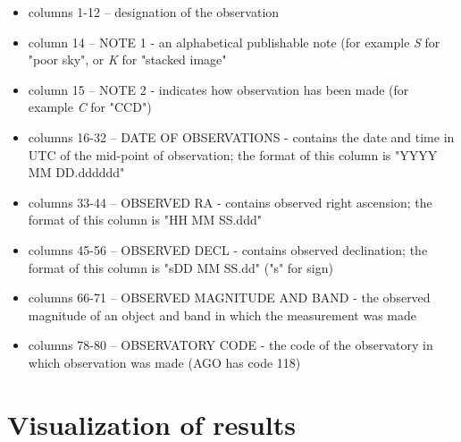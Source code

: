 	\begin{itemize}
		\item columns 1-12 -- designation of the observation
		\item column 14 -- NOTE 1 - an alphabetical publishable note (for example \emph{S} for "poor sky", or \emph{K} for "stacked image"
		\item column 15 -- NOTE 2 - indicates how observation has been made (for example \emph{C} for "CCD")
		\item columns 16-32 -- DATE OF OBSERVATIONS - contains the date and time in UTC of the mid-point of observation; the format of this column is "YYYY MM DD.dddddd"
		\item columns 33-44 -- OBSERVED RA - contains observed right ascension; the format of this column is "HH MM SS.ddd"
		\item columns 45-56 -- OBSERVED DECL - contains observed declination; the format of this column is "sDD MM SS.dd" ("s" for sign)
		\item columns 66-71 -- OBSERVED MAGNITUDE AND BAND - the observed magnitude of an object and band in which the measurement was made
		\item columns 78-80 -- OBSERVATORY CODE - the code of the observatory in which observation was made (AGO has code 118)
	\end{itemize}

\section{Visualization of results}\label{sec:visualization}
